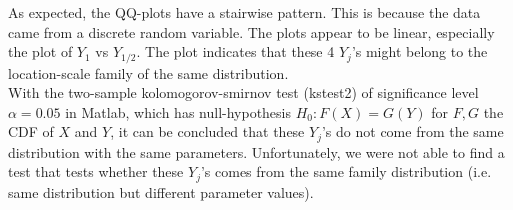 As expected, the QQ-plots have a stairwise pattern. 
This is because the data came from a discrete random variable. 
The plots appear to be linear, especially the plot of $Y_{1}$ vs $Y_{1/2}$. 
The plot indicates that these 4 $Y_j$'s might belong to the location-scale family of the same distribution.\\

With the two-sample kolomogorov-smirnov test (kstest2) of significance level $\alpha=0.05$ in Matlab, which has null-hypothesis $H_0:F(X)=G(Y)$ for $F,G$ the CDF of $X$ and $Y$, it can be concluded that these $Y_j$'s do not come from the same distribution with the same parameters. 
Unfortunately, we were not able to find a test that tests whether these $Y_j$'s comes from the same family distribution (i.e. same distribution but different parameter values).\\




